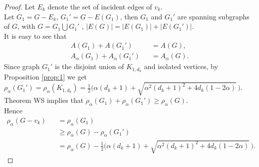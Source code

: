 \documentclass[amsthm]{elsart}
\begin{document}
\begin{proof} Let $E_k $ denote the set of incident edges of $v_k$.
 \\ Let $G_1 = G - E_k$, $G_1' = G - E(G_1)$,
 then $G_1$ and $G_1'$ are spanning subgraphs of $G$, with
 $G = G_1 \bigcup G_1'$ ,
 $|E(G)| = |E(G_1)| + |E(G_1')|$.
\\ It is easy to see that
\begin{eqnarray*}
 A(G_1) + A(G_1') \quad &&= A(G),
\\  A_\alpha (G_1) + A_\alpha (G_1') &&= A_\alpha (G).
\end{eqnarray*}
 Since graph $G_1'$ is the disjoint union of $K_{1,d_k}$ and isolated vertices, by Proposition \ref{prop:1} we get $\rho _\alpha (G_1') = \rho _\alpha (K_{1,d_k}) = \frac{1}{2} \big( \alpha (d_k + 1) + \sqrt{\alpha ^2 (d_k + 1)^2 + 4 d_k (1-2\alpha)} \, \big). $
\\ Theorem WS implies that $\rho _\alpha (G_1) + \rho _\alpha (G_1') \geqslant \rho _\alpha (G)$.
\\ Hence
\begin{eqnarray*}
\rho _\alpha (G - v_k) &&= \rho _\alpha (G_1)
\\ && \geqslant \rho _\alpha (G) - \rho _\alpha (G_1')
\\ && = \rho _\alpha (G) - \frac{1}{2} \big( \alpha (d_k + 1) + \sqrt{\alpha ^2 (d_k + 1)^2 + 4 d_k (1-2\alpha)} \, \big).
\end{eqnarray*}


\end{proof}
\end{document}
